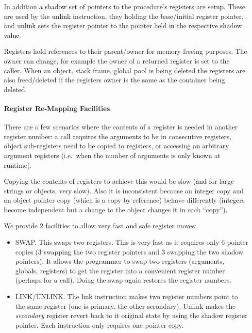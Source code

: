 In addition a shadow set of pointers to the procedure's registers are
setup. These are used by the unlink instruction, they holding the
base/initial register pointer, and unlink sets the register pointer to
the pointer held in the respective shadow value.

Registers hold references to their parent/owner for memory freeing
purposes. The owner can change, for example the owner of a returned
register is set to the caller. When an object, stack frame, global pool
is being deleted the registers are also freed/deleted if the registers
owner is the same as the container being deleted.

\hypertarget{register-re-mapping-facilities}{%
\paragraph{Register Re-Mapping
Facilities}\label{register-re-mapping-facilities}}

There are a few scenarios where the contents of a register is needed in
another register number: a call requires the arguments to be in
consecutive registers, object sub-registers need to be copied to
registers, or accessing an arbitrary argument registers (i.e.~when the
number of arguments is only known at runtime).

Copying the contents of registers to achieve this would be slow (and for
large strings or objects, very slow). Also it is inconsistent because an
integer copy and an object pointer copy (which is a copy by reference)
behave differently (integers become independent but a change to the
object changes it in each ``copy'').

We provide 2 facilities to allow very fast and safe register moves:

\begin{itemize}
\item
  SWAP. This swaps two registers. This is very fast as it requires only
  6 pointer copies (3 swapping the two register pointers and 3 swapping
  the two shadow pointers). It allows the programmer to swap two
  registers (arguments, globals, registers) to get the register into a
  convenient register number (perhaps for a call). Doing the swap again
  restores the register numbers.
\item
  LINK/UNLINK. The link instruction makes two register numbers point to
  the same register (one is primary, the other secondary). Unlink makes
  the \emph{secondary} register revert back to it original state by
  using the shadow register pointer. Each instruction only requires one
  pointer copy.
\end{itemize}

